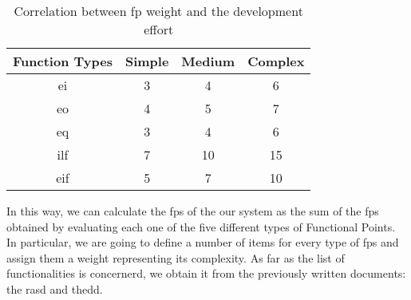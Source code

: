 \begin{table}[htbp]
\begin{center}
\begin{tabular}[t]{cccc}

\hline
\textbf{Function Types} & \textbf{Simple} & \textbf{Medium} & \textbf{Complex}\\
\hline
\acs{ei} & 3 &  4 & 6\\
\hline
\acs{eo} & 4 &  5 & 7\\
\hline
\acs{eq} & 3 &  4 & 6\\
\hline
\acs{ilf} & 7 &  10 & 15\\
\hline
\acs{eif} & 5 &  7 & 10\\
\hline

\end{tabular}
\caption{Correlation between \acs{fp} weight and the development effort}
\end{center}
\end{table}

In this way, we can calculate the \acs{fp}s of the our system as the sum of the \acs{fp}s obtained by evaluating each one of the five different types of Functional Points. In particular, we are going to define a number of items for every type of \acs{fp}s and assign them a weight representing its complexity.
As far as the list of functionalities is concernerd, we obtain it from the previously written documents: the \acl{rasd} and the\acl{dd}.

